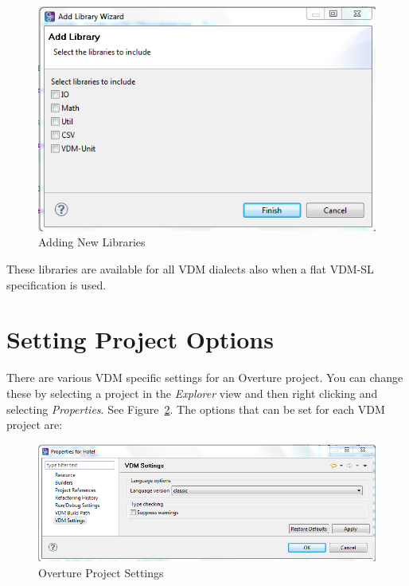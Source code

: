 \documentclass{overturerepchap}
\begin{document}
\begin{figure}[!htb]
	\begin{center}
	  \includegraphics[scale=0.8]{figures/NewLibraries}
	  \caption[Adding New Libraries]{Adding New Libraries}
	  \label{fig:NewLibraries}
	\end{center}
\end{figure}

These libraries are available for all VDM dialects also when a flat
VDM-SL specification is used.

\section{Setting Project Options}\label{subsec:options}

There are various VDM
specific settings for an Overture project. You can change these by
selecting a project
in the \emph{Explorer} view and then right clicking and selecting
\emph{Properties}. See Figure~\ref{fig:VDMSettings}. The options
that can be set for each VDM project are:

\begin{figure}[!hbt]
\begin{center}
  \includegraphics[width=\textwidth]{screenDumps/projectsettings}
  \caption[Overture Project Settings]{Overture Project Settings}
  \label{fig:VDMSettings}
\end{center}
\end{figure}
\end{document}

